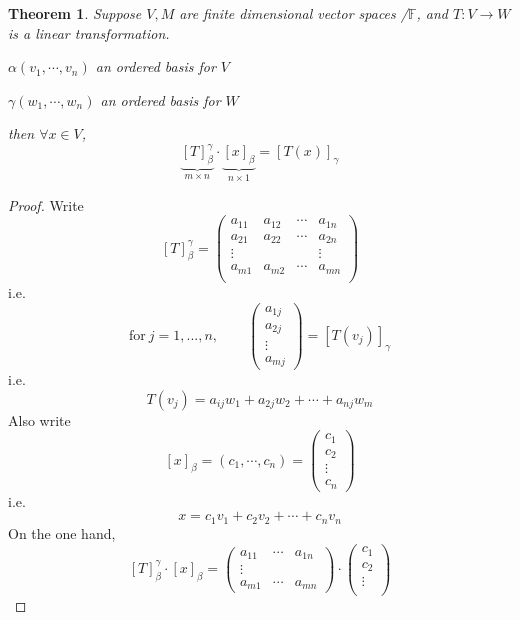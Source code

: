 \documentclass[12pt]{article}
\theoremstyle{plain}
\newtheorem{theorem}{Theorem}[subsection]
\newcommand{\mF}{{\mathbb{F}}}
\begin{document}
	\begin{theorem}
		Suppose $V, M$ are finite dimensional vector spaces /$\mF$, and 
		$T: V\to W$ is a linear transformation. 
		\begin{description}
			\item $\alpha(v_1,\cdots, v_n)$ an ordered basis for $V$
			\item $\gamma(w_1,\cdots, w_n)$ an ordered basis for $W$
		\end{description}
		then $\forall x \in V$, 
		\[
			\underbrace{[T]_{\beta}^{\gamma}}_{m\times n}\cdot
			\underbrace{[x]_{\beta}}_{n\times 1}=[T(x)]_{\gamma}
		\]
	\end{theorem}
	\begin{proof}
		Write 
		\[
			[T]_{\beta}^{\gamma} = 
			\begin{pmatrix}
				a_{11} & a_{12} & \cdots & a_{1n} \\
				a_{21} & a_{22} & \cdots & a_{2n} \\
				\vdots & & & \vdots\\
				a_{m1} & a_{m2} & \cdots & a_{mn} \\
			\end{pmatrix}
		\]
		i.e.
		\[
		\text{for} \ j = 1, ..., n, \qquad 
		\begin{pmatrix}
			a_{1j}\\
			a_{2j}\\
			\vdots\\
			a_{mj}
		\end{pmatrix}
		= [T(v_j)]_{\gamma}
		\]
		i.e. 
		\[
			T(v_j) = a_{ij}w_1 + a_{2j}w_2 + \cdots + a_{nj}w_m
		\]
		Also write 
		\[
			[x]_{\beta} = (c_1,\cdots, c_n) = 
			\begin{pmatrix}
				c_1\\
				c_2\\
				\vdots\\
				c_n
			\end{pmatrix}
		\]
		i.e.
		\[
			x = c_1v_1 + c_2v_2 + \cdots + c_nv_n
		\]
		On the one hand, 
		\[
			[T]^{\gamma}_{\beta} \cdot [x]_{\beta} = 
			\begin{pmatrix}
				a_{11} & \cdots & a_{1n}\\
				\vdots & & \\
				a_{m1} & \cdots & a_{mn} 
			\end{pmatrix}
			\cdot 
			\begin{pmatrix}
				c_1\\
				c_2\\
				\vdots\\

\end{pmatrix}\]
\end{proof}
\end{document}
